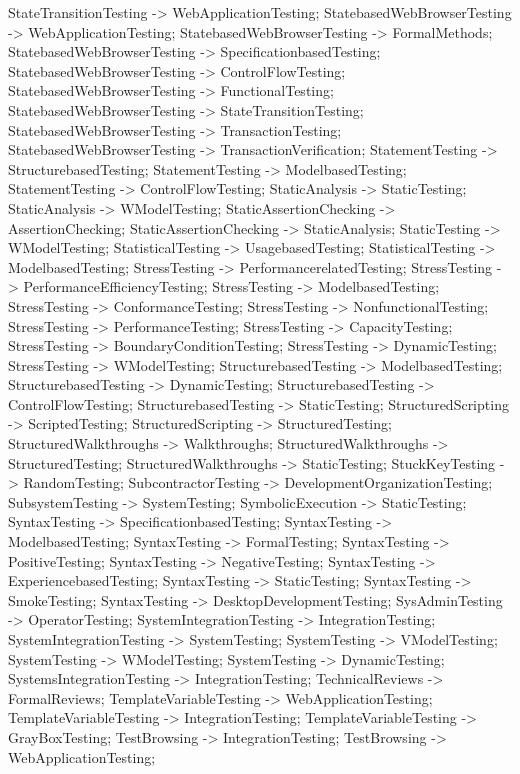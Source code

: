 \documentclass{article}
\begin{document}
{StateTransitionTesting -> WebApplicationTesting;
StatebasedWebBrowserTesting -> WebApplicationTesting;
StatebasedWebBrowserTesting -> FormalMethods;
StatebasedWebBrowserTesting -> SpecificationbasedTesting;
StatebasedWebBrowserTesting -> ControlFlowTesting;
StatebasedWebBrowserTesting -> FunctionalTesting;
StatebasedWebBrowserTesting -> StateTransitionTesting;
StatebasedWebBrowserTesting -> TransactionTesting;
StatebasedWebBrowserTesting -> TransactionVerification;
StatementTesting -> StructurebasedTesting;
StatementTesting -> ModelbasedTesting;
StatementTesting -> ControlFlowTesting;
StaticAnalysis -> StaticTesting;
StaticAnalysis -> WModelTesting;
StaticAssertionChecking -> AssertionChecking;
StaticAssertionChecking -> StaticAnalysis;
StaticTesting -> WModelTesting;
StatisticalTesting -> UsagebasedTesting;
StatisticalTesting -> ModelbasedTesting;
StressTesting -> PerformancerelatedTesting;
StressTesting -> PerformanceEfficiencyTesting;
StressTesting -> ModelbasedTesting;
StressTesting -> ConformanceTesting;
StressTesting -> NonfunctionalTesting;
StressTesting -> PerformanceTesting;
StressTesting -> CapacityTesting;
StressTesting -> BoundaryConditionTesting;
StressTesting -> DynamicTesting;
StressTesting -> WModelTesting;
StructurebasedTesting -> ModelbasedTesting;
StructurebasedTesting -> DynamicTesting;
StructurebasedTesting -> ControlFlowTesting;
StructurebasedTesting -> StaticTesting;
StructuredScripting -> ScriptedTesting;
StructuredScripting -> StructuredTesting;
StructuredWalkthroughs -> Walkthroughs;
StructuredWalkthroughs -> StructuredTesting;
StructuredWalkthroughs -> StaticTesting;
StuckKeyTesting -> RandomTesting;
SubcontractorTesting -> DevelopmentOrganizationTesting;
SubsystemTesting -> SystemTesting;
SymbolicExecution -> StaticTesting;
SyntaxTesting -> SpecificationbasedTesting;
SyntaxTesting -> ModelbasedTesting;
SyntaxTesting -> FormalTesting;
SyntaxTesting -> PositiveTesting;
SyntaxTesting -> NegativeTesting;
SyntaxTesting -> ExperiencebasedTesting;
SyntaxTesting -> StaticTesting;
SyntaxTesting -> SmokeTesting;
SyntaxTesting -> DesktopDevelopmentTesting;
SysAdminTesting -> OperatorTesting;
SystemIntegrationTesting -> IntegrationTesting;
SystemIntegrationTesting -> SystemTesting;
SystemTesting -> VModelTesting;
SystemTesting -> WModelTesting;
SystemTesting -> DynamicTesting;
SystemsIntegrationTesting -> IntegrationTesting;
TechnicalReviews -> FormalReviews;
TemplateVariableTesting -> WebApplicationTesting;
TemplateVariableTesting -> IntegrationTesting;
TemplateVariableTesting -> GrayBoxTesting;
TestBrowsing -> IntegrationTesting;
TestBrowsing -> WebApplicationTesting;
}
\end{document}
